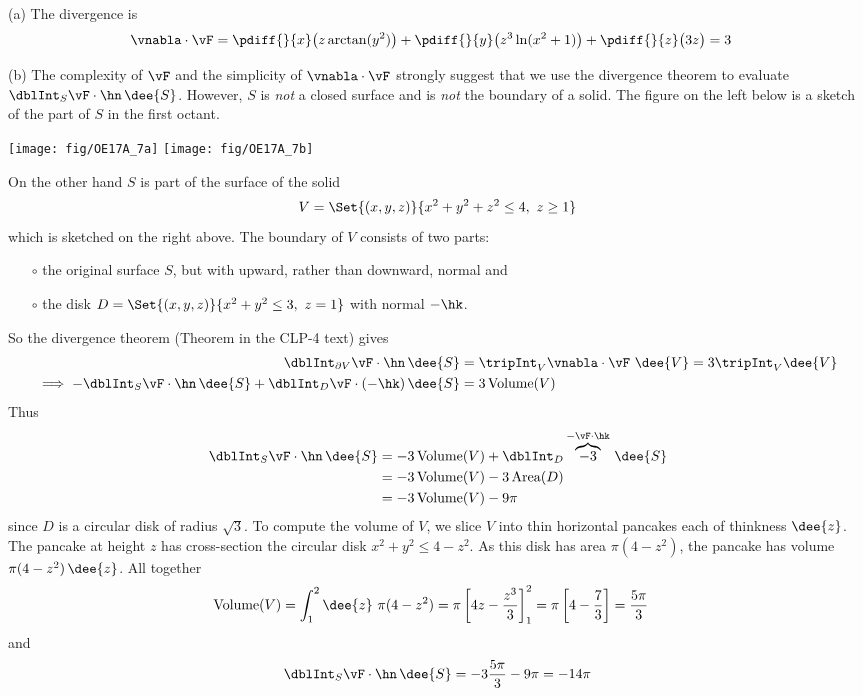\begin{solution} (a) The divergence is
\begin{align*}
\vnabla\cdot\vF
&=\pdiff{}{x}\big(z \arctan(y^2)\big)
      +  \pdiff{}{y}\big(z^3 \ln(x^2 + 1)\big)
      +  \pdiff{}{z}\big(3z\big) 
= 3
\end{align*}

(b) The complexity of $\vF$ and the simplicity of $\vnabla\cdot\vF$
strongly suggest that we use the divergence theorem to evaluate
$\dblInt_S \vF \cdot\hn\,\dee{S}$. However, $S$ is \emph{not} a closed
surface and is \emph{not} the boundary of a solid. The figure on the left below
is a sketch of the part of $S$ in the first octant.
\begin{center}
     \texttt{[image: fig/OE17A\_7a]}\qquad
     \texttt{[image: fig/OE17A\_7b]}
\end{center}
On the other hand $S$ is part of the surface of the solid
\begin{equation*}
V=\Set{(x,y,z)}{x^2+y^2+z^2\le 4,\ z\ge 1}
\end{equation*}
which is sketched on the right above. The boundary of $V$ consists of two parts:
\begin{itemize}\itemsep1pt \parskip0pt  %
\item[$\circ$]
the original surface $S$, but with upward, rather than downward, normal and
\item[$\circ$]
the disk $D=\Set{(x,y,z)}{ x^2+y^2\le 3,\ z=1}$ with normal $-\hk$.
\end{itemize}
So the divergence theorem (Theorem  in the 
CLP-4 text) gives
\begin{align*}
   \dblInt_{\partial V}\vF\cdot\hn\,\dee{S} 
           &= \tripInt_V\vnabla\cdot\vF\ \dee{V}
           = 3 \tripInt_V \dee{V} \\
\implies
  -\dblInt_S\vF\cdot\hn\,\dee{S} +\dblInt_D\vF\cdot(-\hk)\,\dee{S} 
           &=3\,\text{Volume}(V)
\end{align*}
Thus
\begin{align*}
\dblInt_S\vF\cdot\hn\,\dee{S} &= -3\,\text{Volume}(V)
                      + \dblInt_D\overbrace{-3}^{-\vF\cdot\hk}\,\dee{S} \\
&= -3\,\text{Volume}(V) -3\,\text{Area}(D) \\
&= -3\,\text{Volume}(V) -9\pi
\end{align*}
since $D$ is a circular disk of radius $\sqrt{3}$. To compute the volume
of $V$, we slice $V$ into thin horizontal pancakes each of thinkness $\dee{z}$. 
The pancake at height $z$ has cross-section the circular disk 
$x^2+y^2\le 4-z^2$. As this disk has area $\pi(4-z^2)$, the pancake has volume 
$\pi(4-z^2)\,\dee{z}$. All together
\begin{align*}
\text{Volume}(V)
&=\int_1^2\dee{z}\ \pi(4-z^2)
=\pi\left[4z-\frac{z^3}{3}\right]_1^2
=\pi\left[4-\frac{7}{3}\right]
=\frac{5\pi}{3}
\end{align*}
and
\begin{equation*}
\dblInt_S\vF\cdot\hn\,\dee{S} =-3\frac{5\pi}{3}-9\pi
=-14\pi
\end{equation*}
\end{solution}

